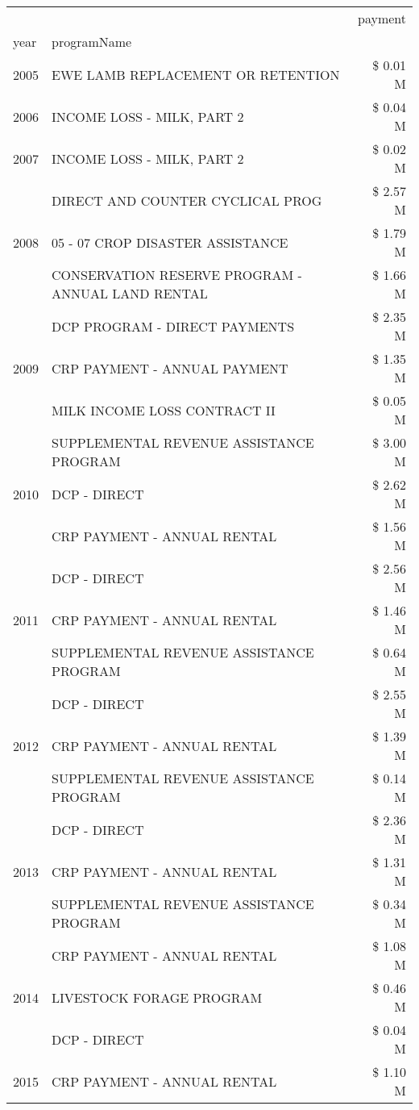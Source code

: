 \begin{tabular}{llr}
\toprule
 &  & payment \\
year & programName &  \\
\midrule
2005 & EWE LAMB REPLACEMENT OR RETENTION & \$ 0.01 M \\
\cline{1-3}
2006 & INCOME LOSS - MILK, PART 2 & \$ 0.04 M \\
\cline{1-3}
2007 & INCOME LOSS - MILK, PART 2 & \$ 0.02 M \\
\cline{1-3}
\multirow[t]{3}{*}{2008} & DIRECT AND COUNTER CYCLICAL PROG & \$ 2.57 M \\
 & 05 - 07 CROP DISASTER ASSISTANCE & \$ 1.79 M \\
 & CONSERVATION RESERVE PROGRAM - ANNUAL LAND RENTAL & \$ 1.66 M \\
\cline{1-3}
\multirow[t]{3}{*}{2009} & DCP PROGRAM - DIRECT PAYMENTS & \$ 2.35 M \\
 & CRP PAYMENT - ANNUAL PAYMENT & \$ 1.35 M \\
 & MILK INCOME LOSS CONTRACT II & \$ 0.05 M \\
\cline{1-3}
\multirow[t]{3}{*}{2010} & SUPPLEMENTAL REVENUE ASSISTANCE PROGRAM & \$ 3.00 M \\
 & DCP - DIRECT & \$ 2.62 M \\
 & CRP PAYMENT - ANNUAL RENTAL & \$ 1.56 M \\
\cline{1-3}
\multirow[t]{3}{*}{2011} & DCP - DIRECT & \$ 2.56 M \\
 & CRP PAYMENT - ANNUAL RENTAL & \$ 1.46 M \\
 & SUPPLEMENTAL REVENUE ASSISTANCE PROGRAM & \$ 0.64 M \\
\cline{1-3}
\multirow[t]{3}{*}{2012} & DCP - DIRECT & \$ 2.55 M \\
 & CRP PAYMENT - ANNUAL RENTAL & \$ 1.39 M \\
 & SUPPLEMENTAL REVENUE ASSISTANCE PROGRAM & \$ 0.14 M \\
\cline{1-3}
\multirow[t]{3}{*}{2013} & DCP - DIRECT & \$ 2.36 M \\
 & CRP PAYMENT - ANNUAL RENTAL & \$ 1.31 M \\
 & SUPPLEMENTAL REVENUE ASSISTANCE PROGRAM & \$ 0.34 M \\
\cline{1-3}
\multirow[t]{3}{*}{2014} & CRP PAYMENT - ANNUAL RENTAL & \$ 1.08 M \\
 & LIVESTOCK FORAGE PROGRAM & \$ 0.46 M \\
 & DCP - DIRECT & \$ 0.04 M \\
\cline{1-3}
\multirow[t]{3}{*}{2015} & CRP PAYMENT - ANNUAL RENTAL & \$ 1.10 M \\

\end{tabular}
